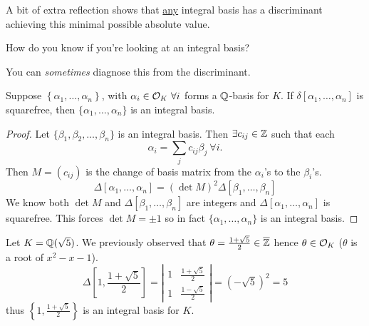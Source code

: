 \begin{remark}
    A bit of extra reflection shows that \ul{any} integral basis has a discriminant achieving this minimal possible absolute value.
\end{remark}

\begin{ques*}
    How do you know if you're looking at an integral basis?
\end{ques*}
You can \emph{sometimes} diagnose this from the discriminant.
\begin{theorem}
    Suppose $\left\{ \alpha_1, \dots, \alpha_n \right\}$, with $\alpha_i\in\mathcal{O}_K\ \forall i$ forms a $\mathbb Q$-basis for $K$. If $\delta[\alpha_1, \dots, \alpha_n]$ is squarefree, then $\{\alpha_1, \dots, \alpha_n\}$ is an integral basis.
\end{theorem}
\begin{proof}
    Let $\{\beta_1, \beta_2, \dots, \beta_n\}$ is an integral basis. Then $\exists c_{ij}\in\mathbb Z$ such that each
    \[\alpha_i = \sum_{j}c_{ij}\beta_j\ \forall i.\]
    Then $M= (c_{ij})$ is the change of basis matrix from the $\alpha_i$'s to the $\beta_i$'s.
    \[\Delta[\alpha_1, \dots, \alpha_n] = (\det M)^2 \Delta[\beta_1, \dots, \beta_n]\]
    We know both $\det M$ and $\Delta[\beta_1, \dots, \beta_n]$ are integers and $\Delta[\alpha_1, \dots, \alpha_n]$ is squarefree. This forces $\det M = \pm 1$ so in fact $\{\alpha_1, \dots, \alpha_n\}$ is an integral basis.
\end{proof}
\begin{example}
    Let $K = \mathbb Q(\sqrt{5})$. We previously observed that $\theta = \frac{1+\sqrt{5}}{2}\in\overline{\mathbb Z}$ hence $\theta\in\mathcal{O}_K$ ($\theta$ is a root of $x^2 - x - 1$).
    \[\Delta\left[ 1, \frac{1+\sqrt{5}}{2} \right] = \left|\begin{array}{cc}
            1 & \frac{1+\sqrt{5}}{2} \\
            1 & \frac{1-\sqrt{5}}{2}
        \end{array}\right| = (-\sqrt{5})^2 = 5\]
    thus $\left\{ 1, \frac{1+\sqrt{5}}{2} \right\}$ is an integral basis for $K$.
\end{example}

